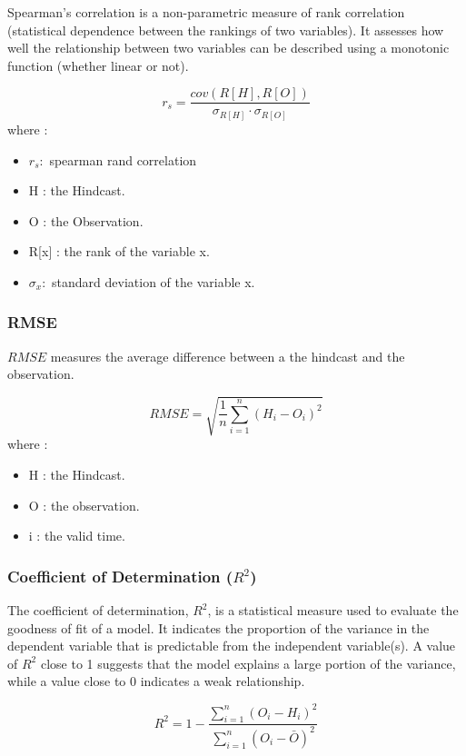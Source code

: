 Spearman's correlation is a non-parametric measure of rank correlation 
(statistical dependence between the rankings of two variables). 
It assesses how well the relationship between two variables can be described using a monotonic function (whether linear or not).  

$$r_s=\frac{cov(R[H],R[O])}{\sigma_{R[H]} \cdot \sigma_{R[O]}}$$
where : \\

\begin{itemize}
	\item $r_s : $ spearman rand correlation 
	\item H : the Hindcast.
	\item O : the Observation.
	\item R[x] : the rank of the variable x. 
	\item $\sigma_x : $ standard deviation of the variable x.
\end{itemize}






\subsubsection{RMSE}
 
 $RMSE$ measures the average difference between a the hindcast and the observation.
 
$$RMSE=\sqrt{\frac{1}{n} \sum\limits_{i=1}^{n}(H_i -O_i)^2}$$
where :
\begin{itemize}
	\item H : the Hindcast.
	\item O : the observation.
	\item i : the valid time.
\end{itemize}

\subsubsection{Coefficient of Determination (\( R^2 \))}

The coefficient of determination, \( R^2 \), is a statistical measure used to evaluate the goodness of fit of a model. It indicates the proportion of the variance in the dependent variable that is predictable from the independent variable(s). A value of \( R^2 \) close to 1 suggests that the model explains a large portion of the variance, while a value close to 0 indicates a weak relationship.

\[
R^2 = 1 - \frac{\sum_{i=1}^n (O_i - H_i)^2}{\sum_{i=1}^n (O_i - \bar{O})^2}
\]

